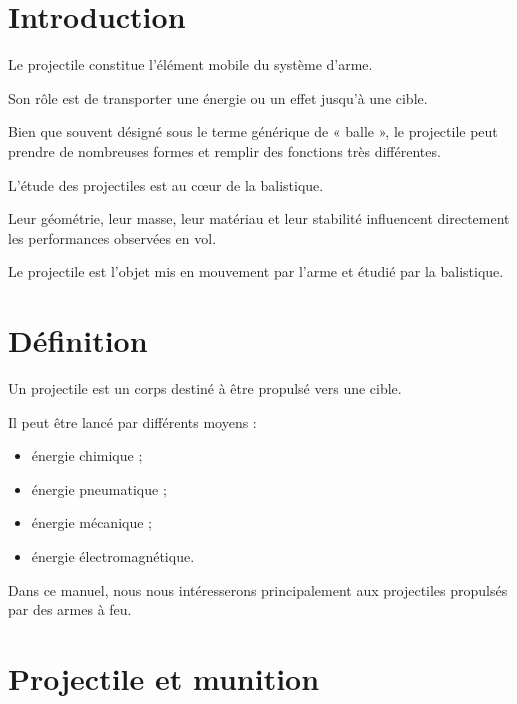 
\section{Introduction}

Le projectile constitue l'élément mobile du système d'arme.

Son rôle est de transporter une énergie ou un effet jusqu'à une cible.

Bien que souvent désigné sous le terme générique de « balle », le projectile
peut prendre de nombreuses formes et remplir des fonctions très différentes.

L'étude des projectiles est au cœur de la balistique.

Leur géométrie, leur masse, leur matériau et leur stabilité influencent
directement les performances observées en vol.

\begin{aretenir}

Le projectile est l'objet mis en mouvement par l'arme et étudié par la
balistique.

\end{aretenir}

\section{Définition}

Un projectile est un corps destiné à être propulsé vers une cible.

Il peut être lancé par différents moyens :

\begin{itemize}
    \item énergie chimique ;
    \item énergie pneumatique ;
    \item énergie mécanique ;
    \item énergie électromagnétique.
\end{itemize}

Dans ce manuel, nous nous intéresserons principalement aux projectiles
propulsés par des armes à feu.

\section{Projectile et munition}

